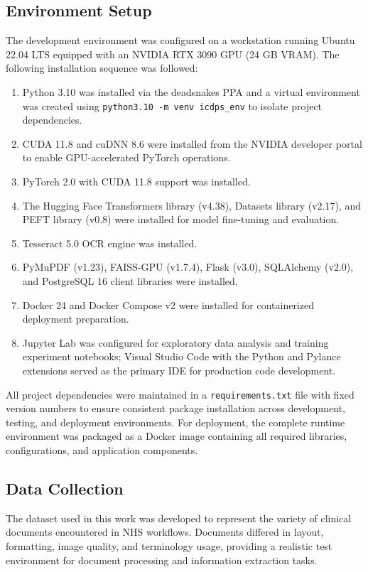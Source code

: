 \subsection{Environment Setup}
The development environment was configured on a workstation running Ubuntu 22.04 LTS equipped with an NVIDIA RTX 3090 GPU (24 GB VRAM). The following installation sequence was followed:
\begin{enumerate}
    \item Python 3.10 was installed via the deadsnakes PPA and a virtual environment was created using \texttt{python3.10 -m venv icdps\_env} to isolate project dependencies.
    \item CUDA 11.8 and cuDNN 8.6 were installed from the NVIDIA developer portal to enable GPU-accelerated PyTorch operations.
    \item PyTorch 2.0 with CUDA 11.8 support was installed.
    \item The Hugging Face Transformers library (v4.38), Datasets library (v2.17), and PEFT library (v0.8) were installed for model fine-tuning and evaluation.
    \item Tesseract 5.0 OCR engine was installed.
    \item PyMuPDF (v1.23), FAISS-GPU (v1.7.4), Flask (v3.0), SQLAlchemy (v2.0), and PostgreSQL 16 client libraries were installed.
    \item Docker 24 and Docker Compose v2 were installed for containerized deployment preparation.
    \item Jupyter Lab was configured for exploratory data analysis and training experiment notebooks; Visual Studio Code with the Python and Pylance extensions served as the primary IDE for production code development.
\end{enumerate}

All project dependencies were maintained in a \texttt{requirements.txt} file with fixed version numbers to ensure consistent package installation across development, testing, and deployment environments. For deployment, the complete runtime environment was packaged as a Docker image containing all required libraries, configurations, and application components.

\subsection{Data Collection}

The dataset used in this work was developed to represent the variety of clinical documents encountered in NHS workflows. Documents differed in layout, formatting, image quality, and terminology usage, providing a realistic test environment for document processing and information extraction tasks.

